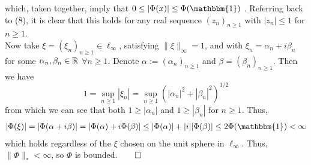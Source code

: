 \documentclass[10pt]{article}
\newcommand{\1}[1]{\mathbbm{1}_{#1}} \newcommand{\mc}[1]{\mathcal{#1}}
\begin{document}
    which, taken together, imply that $0\leq |\Phi(x)|\leq \Phi(\mathbbm{1})$ . Referring back to (8), it is clear that this holds for any real sequence $(z_n)_{n\geq 1}$ with $|z_n|\leq 1$ for $n\geq 1$.\\[5pt]
    Now take $\xi=(\xi_n)_{n\geq 1}\in\ell_\infty$, satisfying $\|\xi\|_\infty=1$, and with $\xi_n=\alpha_n+i\beta_n$ for some $\alpha_n,\beta_n\in\mathbb{R}$ $\forall n\geq 1$. Denote $\alpha:=(\alpha_n)_{n\geq 1}$ and $\beta=(\beta_n)_{n\geq 1}$. Then we have
    \[1=\sup_{n\geq 1}|\xi_n|=\sup_{n\geq 1}(|\alpha_n|^2+|\beta_n|^2)^{1/2}\]
    from which we can see that both $1\geq |\alpha_n|$ and $1\geq |\beta_n|$ for $n\geq 1$. Thus,
    \begin{align*}
        |\Phi(\xi)|=|\Phi(\alpha+i\beta)|=|\Phi(\alpha)+i\Phi(\beta)|\leq |\Phi(\alpha)|+|i||\Phi(\beta)|\leq 2\Phi(\mathbbm{1})<\infty
    \end{align*}
    which holds regardless of the $\xi$ chosen on the unit sphere in $\ell_\infty$. Thus, $\|\Phi\|_\ast<\infty$, so $\Phi$ is bounded.\hfill{$\qed$}
    
\end{document}
